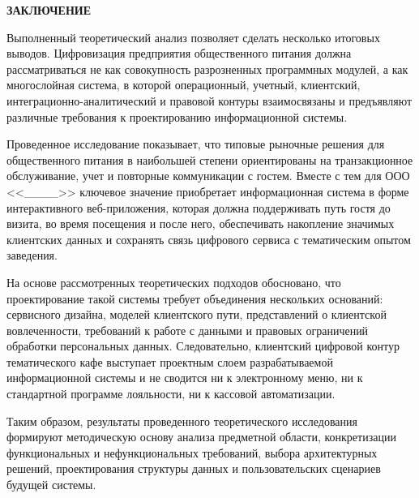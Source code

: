 \newpage
\begin{center}
  \textbf{\large ЗАКЛЮЧЕНИЕ}
\end{center}

Выполненный теоретический анализ позволяет сделать несколько итоговых выводов. Цифровизация предприятия общественного питания должна рассматриваться не как совокупность разрозненных программных модулей, а как многослойная система, в которой операционный, учетный, клиентский, интеграционно-аналитический и правовой контуры взаимосвязаны и предъявляют различные требования к проектированию информационной системы.

Проведенное исследование показывает, что типовые рыночные решения для общественного питания в наибольшей степени ориентированы на транзакционное обслуживание, учет и повторные коммуникации с гостем. Вместе с тем для ООО <<\_\_\_\_>> ключевое значение приобретает информационная система в форме интерактивного веб-приложения, которая должна поддерживать путь гостя до визита, во время посещения и после него, обеспечивать накопление значимых клиентских данных и сохранять связь цифрового сервиса с тематическим опытом заведения.

На основе рассмотренных теоретических подходов обосновано, что проектирование такой системы требует объединения нескольких оснований: сервисного дизайна, моделей клиентского пути, представлений о клиентской вовлеченности, требований к работе с данными и правовых ограничений обработки персональных данных. Следовательно, клиентский цифровой контур тематического кафе выступает проектным слоем разрабатываемой информационной системы и не сводится ни к электронному меню, ни к стандартной программе лояльности, ни к кассовой автоматизации.

Таким образом, результаты проведенного теоретического исследования формируют методическую основу анализа предметной области, конкретизации функциональных и нефункциональных требований, выбора архитектурных решений, проектирования структуры данных и пользовательских сценариев будущей системы.
